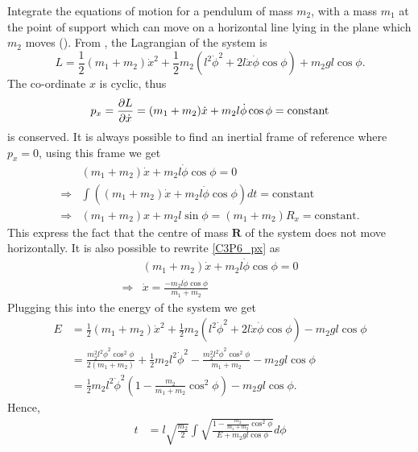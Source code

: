 \begin{problem}
{
Integrate the equations of motion for a pendulum of mass $m_2$, with a mass $m_1$ at the point of support which can move on a horizontal line lying in the plane which $m_2$ moves ().
}
{
From , the Lagrangian of the system is
\begin{equation*}
    L = \frac{1}{2} (m_1 + m_2) \Dot{x}^2 +  \frac{1}{2} m_2 (l^2 \Dot{\phi}^2 + 2 l \Dot{x} \Dot{\phi} \cos{\phi} ) + m_2 g l \cos{\phi}.
\end{equation*}
The co-ordinate $x$ is cyclic, thus
\begin{equation} \label{C3P6_px}
    p_x = \frac{\partial L}{\partial \Dot{x}} = (m_1 + m_2) \Dot{x} + m_2 l \Dot{\phi} \cos{\phi} = \text{constant}
\end{equation}
is conserved. It is always possible to find an inertial frame of reference where $p_x=0$, using this frame we get
\begin{align}
    &(m_1 + m_2) \Dot{x} + m_2 l \Dot{\phi} \cos{\phi} = 0 \nonumber \\
    \Rightarrow &\int \left( (m_1 + m_2) \Dot{x} + m_2 l \Dot{\phi} \cos{\phi} \right)dt = \text{constant} \nonumber \\
    \Rightarrow &(m_1 + m_2) x + m_2 l \sin{\phi} = (m_1+m_2)R_x = \text{constant} . \label{C3P6_Rx}
\end{align}
This express the fact that the centre of mass $\mathbf{R}$ of the system does not move horizontally. It is also possible to rewrite \eqref{C3P6_px} as
\begin{align*}
    &(m_1 + m_2) \Dot{x} + m_2 l \Dot{\phi} \cos{\phi} = 0\\
    \Rightarrow&\Dot{x} = \frac{-m_2l\Dot{\phi}\cos{\phi}}{m_1+m_2}
\end{align*}
Plugging this into the energy of the system we get
\begin{align*}
    E &= \frac{1}{2} (m_1 + m_2) \Dot{x}^2 +  \frac{1}{2} m_2 (l^2 \Dot{\phi}^2 + 2 l \Dot{x} \Dot{\phi} \cos{\phi} ) - m_2 g l \cos{\phi} \\
    &= \frac{m_2^2l^2\Dot{\phi}^2\cos^2{\phi}}{2(m_1+m_2)} +  \frac{1}{2} m_2 l^2 \Dot{\phi}^2 -  \frac{m_2^2l^2\Dot{\phi}^2\cos^2{\phi}}{m_1+m_2} - m_2 g l \cos{\phi} \\
    &= \frac{1}{2}m_2l^2\Dot{\phi}^2 \left( 1 -\frac{m_2}{m_1+m_2}\cos^2{\phi} \right) - m_2 g l \cos{\phi}.
\end{align*}
Hence,
\begin{align*}
    t &= l\sqrt{\frac{m_2}{2}}\int\sqrt{\frac{1-\frac{m_2}{m_1+m_2}\cos^2{\phi}}{E+m_2gl\cos{\phi}}}d\phi \\

\end{align*}}
\end{problem}
